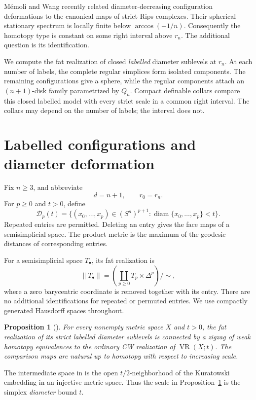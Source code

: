 \documentclass[11pt,a4paper]{article}
\newtheorem{proposition}[theorem]{Proposition}
\theoremstyle{definition}
\DeclareMathOperator{\diam}{diam}
\newcommand{\fat}[1]{\lVert #1\rVert}
\newcommand{\Dconf}{\mathcal D}
\begin{document}
M\'emoli and Wang \cite{MW} recently related diameter-decreasing configuration deformations to the canonical maps of strict Rips complexes. Their spherical stationary spectrum is locally finite below \(\arccos(-1/n)\). Consequently the homotopy type is constant on some right interval above \(r_n\). The additional question is its identification.

We compute the fat realization of closed \emph{labelled} diameter sublevels at \(r_n\). At each number of labels, the complete regular simplices form isolated components. The remaining configurations give a sphere, while the regular components attach an \((n+1)\)-disk family parametrized by \(Q_n\). Compact definable collars compare this closed labelled model with every strict scale in a common right interval. The collars may depend on the number of labels; the interval does not.

\section{Labelled configurations and diameter deformation}
Fix \(n\geq3\), and abbreviate
\[
d=n+1,\qquad r_0=r_n.
\]
For \(p\geq0\) and \(t>0\), define
\[
\Dconf_p(t)=
\{(x_0,\ldots,x_p)\in(S^n)^{p+1}:\diam\{x_0,\ldots,x_p\}<t\}.
\]
Repeated entries are permitted. Deleting an entry gives the face maps of a semisimplicial space. The product metric is the maximum of the geodesic distances of corresponding entries.

For a semisimplicial space \(T_\bullet\), its fat realization is
\[
\fat{T_\bullet}=
\left(\coprod_{p\geq0}T_p\times\Delta^p\right)\big/\sim ,
\]
where a zero barycentric coordinate is removed together with its entry. There are no additional identifications for repeated or permuted entries. We use compactly generated Hausdorff spaces throughout.

\begin{proposition}[{\cite[Propositions~2.6 and~2.9]{MW}}]\label{prop:comparison}
For every nonempty metric space \(X\) and \(t>0\), the fat realization of its strict labelled diameter sublevels is connected by a zigzag of weak homotopy equivalences to the ordinary CW realization of \(\operatorname{VR}(X;t)\). The comparison maps are natural up to homotopy with respect to increasing scale.
\end{proposition}
The intermediate space in \cite{MW} is the open \(t/2\)-neighborhood of the Kuratowski embedding in an injective metric space. Thus the scale in Proposition~\ref{prop:comparison} is the simplex \emph{diameter} bound \(t\).
\end{document}
